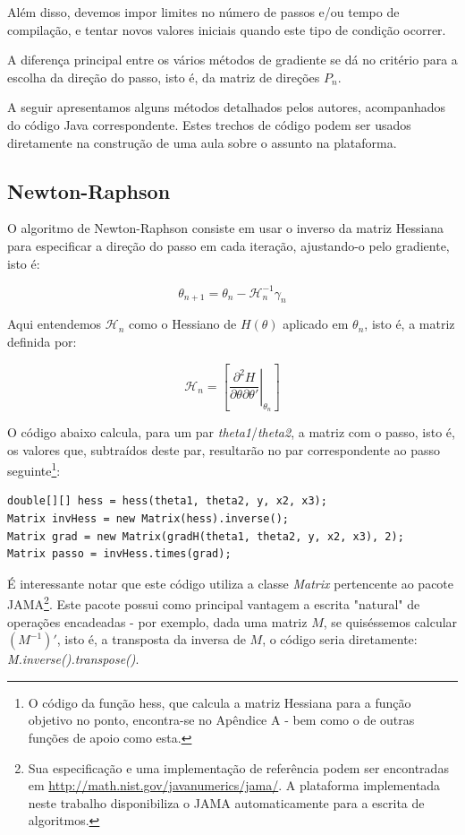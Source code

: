 \documentclass{abnt}
\newenvironment{mylisting}
{\begin{list}{}{\setlength{\leftmargin}{1em}}\item\scriptsize\bfseries}
{\end{list}}
\begin{document}
Além disso, devemos impor limites no número de passos e/ou tempo de compilação, e tentar novos valores iniciais quando este tipo de condição ocorrer.

A diferença principal entre os vários métodos de gradiente se dá no critério para a escolha da direção do passo, isto é, da matriz de direções $P_n$.

A seguir apresentamos alguns métodos detalhados pelos autores, acompanhados do código Java correspondente. Estes trechos de código podem ser usados diretamente na construção de uma aula sobre o assunto na plataforma.

\subsection{Newton-Raphson}

	O algoritmo de Newton-Raphson consiste em usar o inverso da matriz Hessiana para especificar a direção do passo em cada iteração, ajustando-o pelo gradiente, isto é:

\[ \theta_{n+1} = \theta_{n} - \mathcal{H}_{n}^{-1}\gamma_{n} \]

Aqui entendemos $\mathcal{H}_n$ como o Hessiano de $H(\theta)$ aplicado em $\theta_n$, isto é, a matriz definida por:

	\[  \mathcal{H}_n = \left [ \left . \frac{\partial^2 H}{\partial \theta \partial \theta'} \right |_{\theta_n}  \right ] \]


O código abaixo calcula, para um par \textit{theta1}/\textit{theta2}, a matriz com o passo, isto é, os valores que, subtraídos deste par, resultarão no par correspondente ao passo seguinte\footnote{O código da função hess, que calcula a matriz Hessiana para a função objetivo no ponto, encontra-se no Apêndice A - bem como o de outras funções de apoio como esta.}:

\begin{mylisting}
\begin{verbatim}
double[][] hess = hess(theta1, theta2, y, x2, x3);
Matrix invHess = new Matrix(hess).inverse();
Matrix grad = new Matrix(gradH(theta1, theta2, y, x2, x3), 2);
Matrix passo = invHess.times(grad);
\end{verbatim}
\end{mylisting}

É interessante notar que este código utiliza a classe \textit{Matrix} pertencente  ao pacote JAMA\footnote{Sua especificação e uma implementação de referência podem ser encontradas em \url{http://math.nist.gov/javanumerics/jama/}. A plataforma implementada neste trabalho disponibiliza o JAMA automaticamente para a escrita de algoritmos.}. Este pacote possui como principal vantagem a escrita "natural" de operações encadeadas - por exemplo, dada uma matriz $M$, se quiséssemos calcular $(M^{-1})'$, isto é, a transposta da inversa de $M$, o código seria diretamente: \textit{M.inverse().transpose()}.
\end{document}
